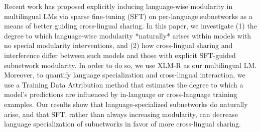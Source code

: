 Recent work has proposed explicitly inducing language-wise modularity in multilingual LMs via sparse fine-tuning (SFT) on per-language subnetworks as a means of better guiding cross-lingual sharing. In this paper, we investigate (1) the degree to which language-wise modularity *naturally* arises within models with no special modularity interventions, and (2) how cross-lingual sharing and interference differ between such models and those with explicit SFT-guided subnetwork modularity. In order to do so, we use XLM-R as our multilingual LM. Moreover, to quantify language specialization and cross-lingual interaction, we use a Training Data Attribution method that estimates the degree to which a model's predictions are influenced by in-language or cross-language training examples. Our results show that language-specialized subnetworks do naturally arise, and that SFT, rather than always increasing modularity, can decrease language specialization of subnetworks in favor of more cross-lingual sharing.